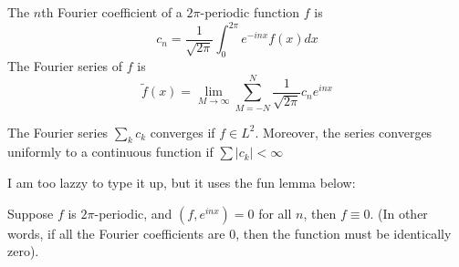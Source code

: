 \documentclass[openany]{book}
\begin{document}
\begin{defn}
    The $n$th Fourier coefficient of a $2\pi$-periodic function $f$ is 
    \begin{equation*}
        c_n=\frac{1}{\sqrt{2\pi}}\int_0^{2\pi}e^{-inx}f(x)dx
    \end{equation*}
    The Fourier series of $f$ is 
    \begin{equation*}
        \tilde{f}(x)=\lim_{M\to\infty}
        \sum_{M=-N}^N\frac{1}{\sqrt{2\pi}}c_ne^{inx}
    \end{equation*}
\end{defn}

\begin{prop}
    The Fourier series $\sum_{k}c_k$ converges if $f\in L^2$. Moreover, the series converges uniformly to a continuous function if $\sum|c_k|<\infty$ 
\end{prop}
I am too lazzy to type it up, but it uses the fun lemma below:
\begin{lem}
    Suppose $f$ is $2\pi$-periodic, and $(f, e^{inx})=0$ for all $n$, then $f\equiv 0$. (In other words, if all the Fourier coefficients are $0$, then the function must be identically zero).
\end{lem}
\end{document}
